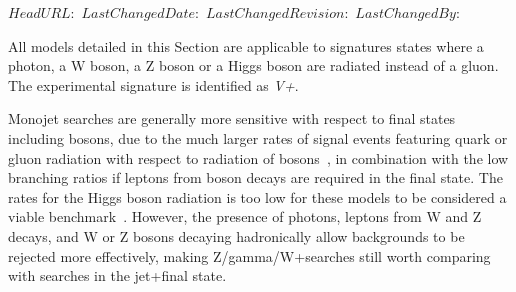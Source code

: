 \svnidlong
{$HeadURL: $}
{$LastChangedDate: $}
{$LastChangedRevision: $}
{$LastChangedBy: $}


All models detailed in this Section are applicable to signatures states where 
 a photon, a W boson, a Z boson or a Higgs boson are radiated instead of a gluon. 
The experimental signature is identified as \textit{V+\MET}.

Monojet searches are generally more sensitive
with respect to final states including bosons, due to the much
larger rates of signal events featuring quark or gluon radiation with
respect to radiation of bosons~\cite{Zhou:2013fla},
in combination with the low branching ratios if leptons from
boson decays are required in the final state.
The rates for the Higgs boson radiation is too low for these models
to be considered a viable benchmark~\cite{Carpenter:2013xra}.
However, the presence of photons,
leptons from W and Z decays,
and W or Z bosons decaying hadronically
allow backgrounds to be rejected more effectively,
making Z/gamma/W+\MET searches
still worth comparing with searches in the jet+\MET final state.




